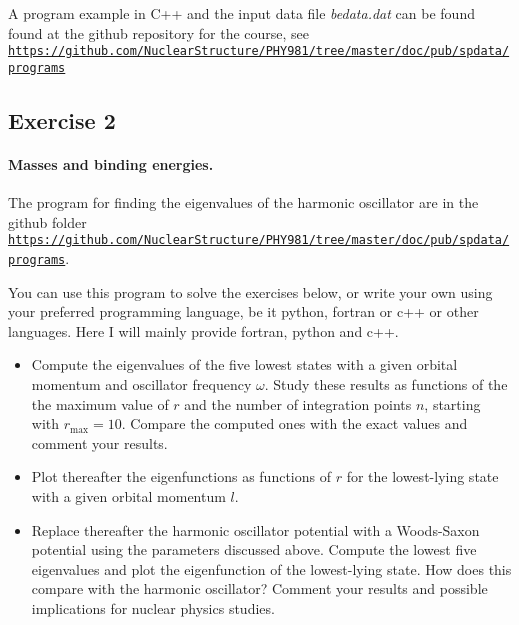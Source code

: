 \documentclass[%
twoside,                 %
final,                   %
10pt]{article}
\begin{document}
A program example in C++ and the input data file \emph{bedata.dat} can be found found at the github repository for the course, see \href{{https://github.com/NuclearStructure/PHY981/tree/master/doc/pub/spdata/programs}}{\nolinkurl{https://github.com/NuclearStructure/PHY981/tree/master/doc/pub/spdata/programs}}



\subsection*{Exercise 2}

\paragraph{Masses and binding energies.}
The program for finding the eigenvalues of the harmonic oscillator are in the github folder
\href{{https://github.com/NuclearStructure/PHY981/tree/master/doc/pub/spdata/programs}}{\nolinkurl{https://github.com/NuclearStructure/PHY981/tree/master/doc/pub/spdata/programs}}.

You can use this program to solve the exercises below, or write your own using your preferred programming language, be it python, fortran or c++ or other languages. Here I will mainly provide fortran, python and c++. 

\begin{itemize}
\item Compute the eigenvalues of the five lowest states with a given orbital momentum and oscillator frequency $\omega$. Study these results as functions of the the maximum value of $r$ and the number of integration points $n$, starting with  $r_{\mathrm{max}}=10$. Compare the computed ones with the exact values and comment your results.

\item Plot thereafter the eigenfunctions as functions of $r$ for the lowest-lying state with a given orbital momentum $l$.

\item Replace thereafter the harmonic oscillator potential with a Woods-Saxon potential using the parameters discussed above. Compute the lowest five eigenvalues and plot the eigenfunction of the lowest-lying state. How does this compare with the harmonic oscillator? Comment your results and possible implications for nuclear physics studies.
\end{itemize}
\end{document}
